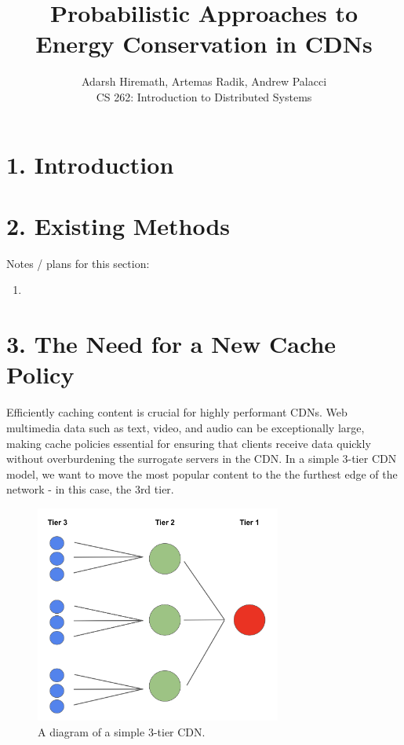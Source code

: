 \documentclass[
	a4paper, %
	10pt, %
	unnumberedsections, %
	twoside, %
]{LTJournalArticle}
\title{Probabilistic Approaches to 
\\ Energy Conservation in CDNs} %
\author{%
	Adarsh Hiremath, Artemas Radik, Andrew Palacci \\
	CS 262: Introduction to Distributed Systems \\
}
\begin{document}
\maketitle %


\begin{abstract}
\end{abstract}
\section{1. Introduction}

\section{2. Existing Methods}
Notes / plans for this section: 
\begin{enumerate}
    \item 
\end{enumerate}

\section{3. The Need for a New Cache Policy}

Efficiently caching content is crucial for highly performant CDNs. Web multimedia data such as text, video, and audio can be exceptionally large, making cache policies essential for ensuring that clients receive data quickly without overburdening the surrogate servers in the CDN. In a simple 3-tier CDN model, we want to move the most popular content to the the furthest edge of the network - in this case, the 3rd tier.  

\begin{figure}[h]
	\begin{center}
		\includegraphics[width=8.1cm]{tier.png}
	\end{center}
	\caption{A diagram of a simple 3-tier CDN.}	
\end{figure}
\end{document}
